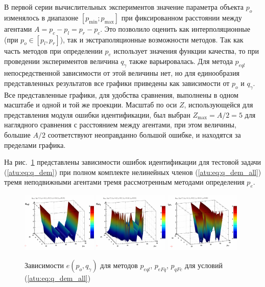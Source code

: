 В первой серии вычислительных экспериментов
значение параметра объекта $p_o$
изменялось в диапазоне  $[ p_{\min}; p_{\max}]$
при фиксированном расстоянии между агентами $A = p_c - p_l = p_r - p_c$.
Это позволило оценить как интерполяционные (при $p_o \in [p_l,p_r] $),
так и экстраполяционные возможности методов. Так как
часть методов при определении $p_e$ использует значения
функции качества, то при проведении экспериментов
величина $q_\gamma$ также варьировалась.
Для метода $p_{eql}$ непосредственной зависимости от этой величины нет,
но для единообразия представленных результатов
все графики приведены как зависимости от $p_o$ и $q_\gamma$.
Все представленные графики, для удобства сравнения,
выполнены в одном масштабе и одной и той же проекции.
Масштаб по оси $Z$, использующейся для представления
модуля ошибки идентификации, был выбран $Z_{\max} = A/2 = 5$
для наглядного сравнения с расстоянием между агентами,
при этом величины, большие $A/2$ соответствуют
неоправданно большой ошибке, и находятся за пределами графика.

На рис.~\ref{atu:f:qsl_pe_po_qg_all} представлены зависимости ошибок идентификации
для тестовой задачи (\ref{atu:eq:q_dem})
при полном комплекте нелинейных членов (\ref{atu:eq:q_dem_all})
тремя неподвижными агентами тремя рассмотренным методами определения $p_e$.

\begin{figure}[htb!]
  \centerline{
    \includegraphics[width=0.32\textwidth]{p/qls_pe-p_po_qg_eql_all.png}
    \hfill
    \includegraphics[width=0.32\textwidth]{p/qls_pe-p_po_qg_eFq_all.png}
    \hfill
    \includegraphics[width=0.32\textwidth]{p/qls_pe-p_po_qg_eFc_all.png}
  }
  \caption{Зависимости $e(p_o,q_\gamma)$ для методов $p_{eql}$, $p_{eFq}$, $p_{qFc}$ для условий (\ref{atu:eq:q_dem_all})}
  \label{atu:f:qsl_pe_po_qg_all}
\end{figure}

